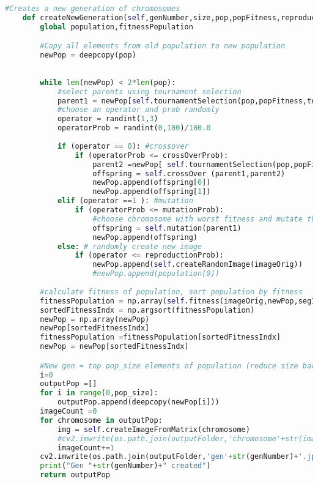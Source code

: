 \documentclass{article}
\begin{document}
\begin{lstlisting}[language=Python]
  #Creates a new generation of chromosomes
    def createNewGeneration(self,genNumber,size,pop,popFitness,reproductionProb):
        global population,fitnessPopulation

        #Copy all elements from old population to new population
        newPop = deepcopy(pop)
        
        
        while len(newPop) < 2*len(pop):
            #select parents using tournament selection
            parent1 = newPop[self.tournamentSelection(pop,popFitness,tournament_size)]    
            #choose an operator and prob randomly
            operator = randint(1,3)
            operatorProb = randint(0,100)/100.0
            
            if (operator == 0): #crossover
                if (operatorProb <= crossOverProb):
                    parent2 =newPop[ self.tournamentSelection(pop,popFitness,tournament_size)]
                    offspring = self.crossOver (parent1,parent2)
                    newPop.append(offspring[0])
                    newPop.append(offspring[1])            
            elif (operator ==1 ): #mutation
                if (operatorProb <= mutationProb):
                    #choose chromosome with worst fitness and mutate that
                    offspring = self.mutation(parent1)
                    newPop.append(offspring)            
            else: # randomly create new image
                if (operator <= reproductionProb):
                    newPop.append(self.createRandomImage(imageOrig))
                    #newPop.append(population[0])
        
        #calculate fitness of population, sort population by fitness
        fitnessPopulation = np.array(self.fitness(imageOrig,newPop,segImage))
        sortedFitnessIndx = np.argsort(fitnessPopulation)
        newPop = np.array(newPop)
        newPop[sortedFitnessIndx]
        fitnessPopulation =fitnessPopulation[sortedFitnessIndx]
        newPop = newPop[sortedFitnessIndx]

        #New gen = top pop_size elements of population (reduce size back to pop_size)
        i=0 
        outputPop =[]
        for i in range(0,pop_size):
            outputPop.append(deepcopy(newPop[i]))
        imageCount =0
        for chromosome in outputPop:
            img = self.createImageFromMatrix(chromosome)
            #cv2.imwrite(os.path.join(outputFolder,'chromosome'+str(imageCount)+'.jpg'),img)
            imageCount+=1
        cv2.imwrite(os.path.join(outputFolder,'gen'+str(genNumber)+'.jpg'),self.createImageFromMatrix( outputPop[0]))
        print("Gen "+str(genNumber)+" created")
        return outputPop
\end{lstlisting}
\end{document}
